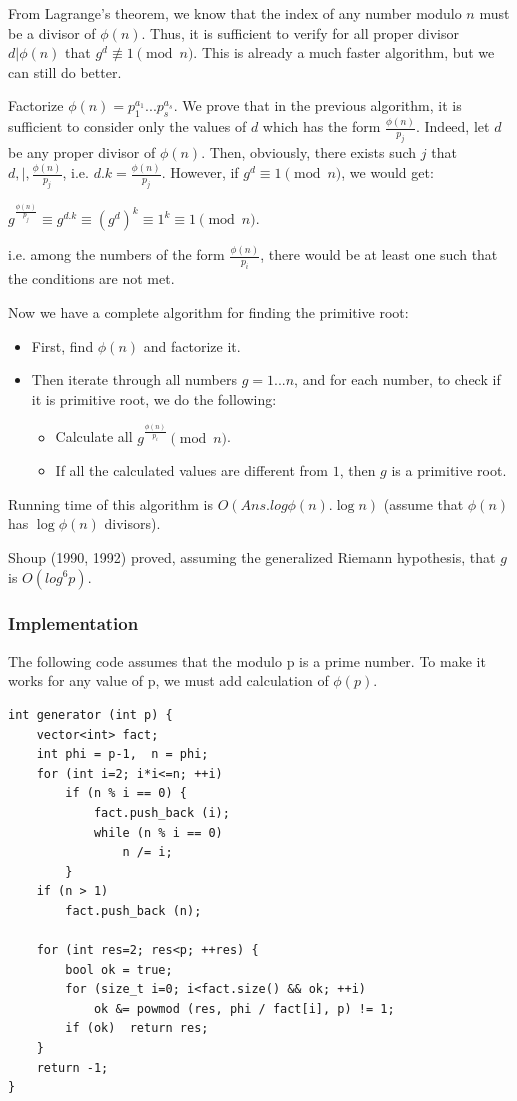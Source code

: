 \documentclass[8pt, a4paper, oneside, twocolumn]{extarticle}
\begin{document}
From Lagrange's theorem, we know that the index of any number modulo $n$ must be a divisor of $\phi (n)$. Thus, it is sufficient to verify for all proper divisor $d \vert \phi (n)$ that $g^d \not \equiv 1 \pmod n$. This is already a much faster algorithm, but we can still do better.

Factorize $\phi (n) = p_1 ^ {a_1} ... p_s ^ {a_s}$. We prove that in the previous algorithm, it is sufficient to consider only the values of $d$ which has the form $\frac { \phi (n) } {p_j}$. Indeed, let $d$ be any proper divisor of $\phi (n)$. Then, obviously, there exists such $j$ that $d , | , \frac { \phi (n) } {p_j}$, i.e. $d . k = \frac { \phi (n) } {p_j}$. However, if $g^d \equiv 1 \pmod n$, we would get:

$g ^ { \frac { \phi (n)} {p_j} } \equiv g ^ {d . k} \equiv (g^d) ^k \equiv 1^k \equiv 1 \pmod n$.

i.e. among the numbers of the form $\frac {\phi (n)} {p_i}$, there would be at least one such that the conditions are not met.

Now we have a complete algorithm for finding the primitive root:
\begin{itemize}
    \item First, find $\phi (n)$ and factorize it.
    \item Then iterate through all numbers $g = 1 ... n$, and for each number, to check if it is primitive root, we do the following:
        \begin{itemize}
        \item Calculate all $g ^ { \frac {\phi (n)} {p_i}} \pmod n$.
        \item If all the calculated values are different from $1$, then $g$ is a primitive root.
        \end{itemize}
\end{itemize}
Running time of this algorithm is $O(Ans . log \phi (n) . \log n)$ (assume that $\phi (n)$ has $\log \phi (n)$ divisors).

Shoup (1990, 1992) proved, assuming the generalized Riemann hypothesis, that $g$ is $O(log^6 p)$.
\subsubsection{Implementation}

The following code assumes that the modulo p is a prime number. To make it works for any value of p, we must add calculation of $\phi (p)$.
\begin{verbatim}
int generator (int p) {
	vector<int> fact;
	int phi = p-1,  n = phi;
	for (int i=2; i*i<=n; ++i)
		if (n % i == 0) {
			fact.push_back (i);
			while (n % i == 0)
				n /= i;
		}
	if (n > 1)
		fact.push_back (n);
 
	for (int res=2; res<p; ++res) {
		bool ok = true;
		for (size_t i=0; i<fact.size() && ok; ++i)
			ok &= powmod (res, phi / fact[i], p) != 1;
		if (ok)  return res;
	}
	return -1;
}
\end{verbatim}
\end{document}
